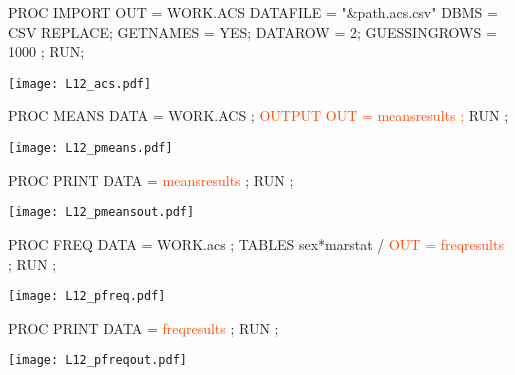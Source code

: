 \begin{frame}[fragile]
\footnotesize
\begin{code}{.0}
PROC IMPORT OUT = WORK.ACS DATAFILE = "&path.acs.csv"
            DBMS = CSV REPLACE;
    GETNAMES = YES;
    DATAROW = 2;
    GUESSINGROWS = 1000 ;
RUN;
\end{code}
\emp
\vskip10pt
\texttt{[image: L12\_acs.pdf]}
\emp
\end{frame}


\begin{frame}[fragile]
\hspace*{-0.3in}
\footnotesize
\begin{code}{.0}
PROC MEANS DATA = WORK.ACS ;
   \textcolor{OrangeRed}{OUTPUT OUT = meansresults ;}
RUN ;
\end{code}
\vspace{4ex}
\texttt{[image: L12\_pmeans.pdf]}
\emp
{} \hspace{0.5in} \emp
{}
\footnotesize
\begin{code}{.0}
PROC PRINT DATA = \textcolor{OrangeRed}{meansresults} ;
RUN ;

\end{code}
\vspace{2ex}
\texttt{[image: L12\_pmeansout.pdf]}
\emp
\end{frame}

\begin{frame}[fragile]
\hspace*{-0.3in}
\footnotesize
\begin{code}{.0}
PROC FREQ DATA = WORK.acs ;
   TABLES sex*marstat /
       \textcolor{OrangeRed}{OUT = freqresults} ;
RUN ;
\end{code}
\vspace{2ex}
\texttt{[image: L12\_pfreq.pdf]}
\emp
{} \hspace{0.5in} \emp
{}
\footnotesize
\begin{code}{.0}
PROC PRINT DATA = \textcolor{OrangeRed}{freqresults} ;
RUN ;


\end{code}
\vspace{2ex}
\texttt{[image: L12\_pfreqout.pdf]}
\emp
\end{frame}

